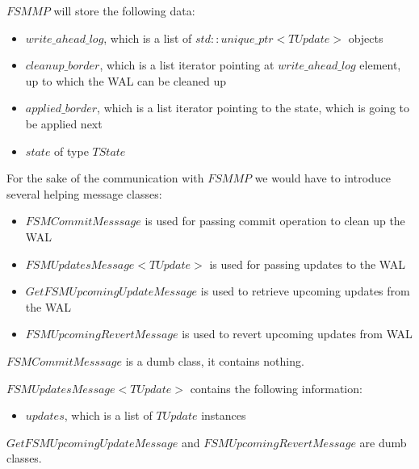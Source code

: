 \documentclass{article}
\begin{document}
$FSMMP$ will store the following data:
\begin{itemize}
	\item $write\_ahead\_log$, which is a list of $std::unique\_ptr<TUpdate>$ objects
	\item $cleanup\_border$, which is a list iterator pointing at $write\_ahead\_log$ element, up to which the WAL can be cleaned up
	\item $applied\_border$, which is a list iterator pointing to the state, which is going to be applied next
	\item $state$ of type $TState$
\end{itemize}

For the sake of the communication with $FSMMP$ we would have to introduce several helping message classes:
\begin{itemize}
	\item $FSMCommitMesssage$ is used for passing commit operation to clean up the WAL
	\item $FSMUpdatesMessage<TUpdate>$ is used for passing updates to the WAL
	\item $GetFSMUpcomingUpdateMessage$ is used to retrieve upcoming updates from the WAL
	\item $FSMUpcomingRevertMessage$ is used to revert upcoming updates from WAL
\end{itemize}

$FSMCommitMesssage$ is a dumb class, it contains nothing.

$FSMUpdatesMessage<TUpdate>$ contains the following information:
\begin{itemize}
	\item $updates$, which is a list of $TUpdate$ instances
\end{itemize}

$GetFSMUpcomingUpdateMessage$ and $FSMUpcomingRevertMessage$ are dumb classes.
\end{document}
